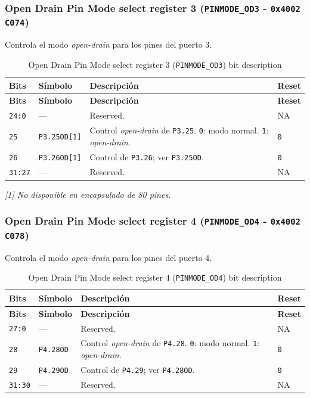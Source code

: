\subsubsection{Open Drain Pin Mode select register 3 (\texttt{PINMODE\_OD3} - \texttt{0x4002 C074})}
Controla el modo \textit{open-drain} para los pines del puerto 3.

\begin{longtable}{|>{\raggedright\arraybackslash}p{}|>{\raggedright\arraybackslash}p{}|>{\raggedright\arraybackslash}p{}|>{\centering\arraybackslash}p{}|}
\caption{Open Drain Pin Mode select register 3 (\texttt{PINMODE\_OD3}) bit description}\\
\hline
\textbf{Bits} & \textbf{Símbolo} & \textbf{Descripción} & \textbf{Reset} \\
\hline
\endfirsthead
\hline
\textbf{Bits} & \textbf{Símbolo} & \textbf{Descripción} & \textbf{Reset} \\
\hline
\endhead
\texttt{24:0} & --- & Reserved. & NA \\
\hline
\texttt{25} & \texttt{P3.25OD[1]} & Control \textit{open-drain} de \texttt{P3.25}. \texttt{0}: modo normal. \texttt{1}: \textit{open-drain}. & \texttt{0} \\
\hline
\texttt{26} & \texttt{P3.26OD[1]} & Control de \texttt{P3.26}; ver \texttt{P3.25OD}. & \texttt{0} \\
\hline
\texttt{31:27} & --- & Reserved. & NA \\
\hline
\end{longtable}
\noindent\textit{[1] No disponible en encapsulado de 80 pines.}

\subsubsection{Open Drain Pin Mode select register 4 (\texttt{PINMODE\_OD4} - \texttt{0x4002 C078})}
Controla el modo \textit{open-drain} para los pines del puerto 4.

\begin{longtable}{|>{\raggedright\arraybackslash}p{}|>{\raggedright\arraybackslash}p{}|>{\raggedright\arraybackslash}p{}|>{\centering\arraybackslash}p{}|}
\caption{Open Drain Pin Mode select register 4 (\texttt{PINMODE\_OD4}) bit description}\\
\hline
\textbf{Bits} & \textbf{Símbolo} & \textbf{Descripción} & \textbf{Reset} \\
\hline
\endfirsthead
\hline
\textbf{Bits} & \textbf{Símbolo} & \textbf{Descripción} & \textbf{Reset} \\
\hline
\endhead
\texttt{27:0} & --- & Reserved. & NA \\
\hline
\texttt{28} & \texttt{P4.28OD} & Control \textit{open-drain} de \texttt{P4.28}. \texttt{0}: modo normal. \texttt{1}: \textit{open-drain}. & \texttt{0} \\
\hline
\texttt{29} & \texttt{P4.29OD} & Control de \texttt{P4.29}; ver \texttt{P4.28OD}. & \texttt{0} \\
\hline
\texttt{31:30} & --- & Reserved. & NA \\
\hline
\end{longtable}

